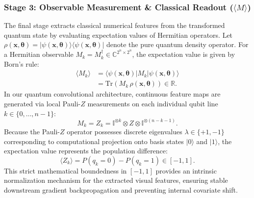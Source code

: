 \documentclass[pdflatex,sn-mathphys-num]{sn-jnl}%
\theoremstyle{thmstyleone}%
\theoremstyle{thmstyletwo}%
\theoremstyle{thmstylethree}%
\begin{document}
\subsubsection{Stage 3: Observable Measurement \& Classical Readout ($\langle M \rangle$)}
The final stage extracts classical numerical features from the transformed quantum state by evaluating expectation values of Hermitian operators. Let $\rho(\mathbf{x}, \boldsymbol{\theta}) = |\psi(\mathbf{x}, \boldsymbol{\theta})\rangle \langle \psi(\mathbf{x}, \boldsymbol{\theta})|$ denote the pure quantum density operator. For a Hermitian observable $M_k = M_k^\dagger \in \mathbb{C}^{2^n \times 2^n}$, the expectation value is given by Born's rule:
\begin{align}
\langle M_k \rangle &= \langle \psi(\mathbf{x}, \boldsymbol{\theta}) | M_k | \psi(\mathbf{x}, \boldsymbol{\theta}) \rangle \nonumber \\
&= \mathrm{Tr}\left( M_k \, \rho(\mathbf{x}, \boldsymbol{\theta}) \right) \in \mathbb{R}.
\label{eq:measurement_born}
\end{align}
In our quantum convolutional architecture, continuous feature maps are generated via local Pauli-$Z$ measurements on each individual qubit line $k \in \{0, \dots, n-1\}$:
\begin{equation}
M_k = Z_k = \mathbb{I}^{\otimes k} \otimes Z \otimes \mathbb{I}^{\otimes (n - k - 1)}.
\label{eq:pauli_z_observable}
\end{equation}
Because the Pauli-$Z$ operator possesses discrete eigenvalues $\lambda \in \{+1, -1\}$ corresponding to computational projection onto basis states $|0\rangle$ and $|1\rangle$, the expectation value represents the population difference:
\begin{equation}
\langle Z_k \rangle = P(q_k = 0) - P(q_k = 1) \in [-1, 1].
\label{eq:pauli_z_bounded}
\end{equation}
This strict mathematical boundedness in $[-1, 1]$ provides an intrinsic normalization mechanism for the extracted visual features, ensuring stable downstream gradient backpropagation and preventing internal covariate shift.
\end{document}
